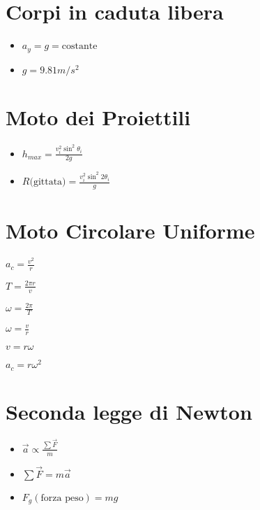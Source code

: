 \documentclass[a4paper,12pt,landscape]{article}
\begin{document}
\begin{multicols*}{2}
    \section*{Corpi in caduta libera}
    \begin{itemize}
        \item $a_y = g = \text{costante}$
        \item $g = 9.81 m/s^2$
    \end{itemize}

    \section*{Moto dei Proiettili}
    \begin{itemize}
        \item $h_{max} = \frac{v_i^2 \sin^2 \theta_i}{2g}$
        \item $R \text{(gittata)} = \frac{v_i^2 \sin^2 2\theta_i}{g}$
    \end{itemize}

    \section*{Moto Circolare Uniforme}
    \begin{itemize}
        \begin{multicols*}{2}
            \item $a_c = \frac{v^2}{r}$
            \item $T = \frac{2 \pi r}{v}$
            \item $\omega = \frac{2\pi}{T}$
            \item $\omega = \frac{v}{r}$
            \item $v = r\omega$
            \item $a_c = r\omega^2$ 
        \end{multicols*}
    \end{itemize}
    
    \section*{Seconda legge di Newton}
    \begin{itemize}
        \item $\vec{a} \propto \frac{\sum \vec{F}}{m}$
        \item $\sum \vec{F} = m\vec{a}$
        \item $F_g (\text{forza peso}) = mg$
    \end{itemize}


\end{multicols*}
\end{document}
